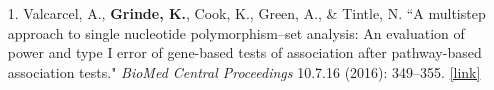 \documentclass[margin]{res}
\begin{document}
\begin{resume}
\begin{itemize}
\item[1.] Valcarcel, A., \textbf{Grinde, K.}, Cook, K., Green, A., \& Tintle, N. ``A multistep approach to single nucleotide polymorphism--set analysis: An evaluation of power and type I error of gene-based tests of association after pathway-based association tests." \textit{BioMed Central Proceedings} 10.7.16 (2016): 349--355.  %
\href{https://bmcproc.biomedcentral.com/articles/10.1186/s12919-016-0055-4}{[link]}

\end{itemize}
	
	
	

\end{resume}
\end{document}
